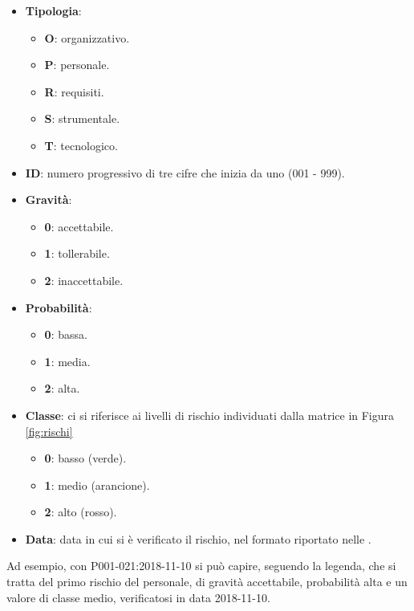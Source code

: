 	\begin{itemize}
		\item \textbf{Tipologia}:
			\begin{itemize}
				\item \textbf{O}: organizzativo.
				\item \textbf{P}: personale.
				\item \textbf{R}: requisiti.
				\item \textbf{S}: strumentale.
				\item \textbf{T}: tecnologico.
			\end{itemize}

		\item \textbf{ID}: numero progressivo di tre cifre che inizia da uno (001 - 999).
		\item \textbf{Gravità}:
			\begin{itemize}
				\item \textbf{0}: accettabile.
				\item \textbf{1}: tollerabile.
				\item \textbf{2}: inaccettabile.
			\end{itemize}

		\item \textbf{Probabilità}:
			\begin{itemize}
				\item \textbf{0}: bassa.
				\item \textbf{1}: media.
				\item \textbf{2}: alta.
			\end{itemize}

		\item \textbf{Classe}: ci si riferisce ai livelli di rischio individuati dalla matrice in Figura \ref{fig:rischi}
			\begin{itemize}
				\item \textbf{0}: basso (verde).
				\item \textbf{1}: medio (arancione).
				\item \textbf{2}: alto (rosso).
			\end{itemize}
			
		\item \textbf{Data}: data in cui si è verificato il rischio, nel formato riportato nelle \NdP.
	\end{itemize}

	Ad esempio, con P001-021:2018-11-10 si può capire, seguendo la legenda, che si tratta del primo rischio del personale, di gravità accettabile, probabilità alta e un valore di classe medio, verificatosi in data 2018-11-10.

